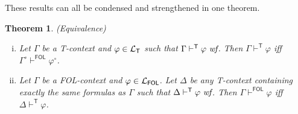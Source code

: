 \documentclass{article}
\newtheorem{theorem}[definition]{Theorem}
\newcommand{\T}{\textsf T}
\newcommand{\FOL}{\textsf{FOL}}
\newcommand{\ofun}[1]{\ensuremath{{#1}^\circ}}
\newcommand{\wf}{\ \mbox{\em wf}}
\newcommand{\lang}[1]{\ensuremath{{\cal L}_{\mathsf{#1}}}}
\newcommand{\myvdash}[1]{\ensuremath{\vdash^{\mathsf{#1}}}}
\begin{document}
\bigskip\noindent
These results can all be condensed and strengthened in one theorem.
\begin{theorem}\label{TequivFOL}
\emph{(Equivalence)}
\begin{enumerate}[(i)]
\item Let $\Gamma$ be a {\T}-context and $\varphi\in\lang{T}$ such that
$\Gamma\myvdash{T}\varphi\wf$.  Then $\Gamma\myvdash{T}\varphi$ iff
$\ofun\Gamma\myvdash{FOL}\ofun\varphi$.
\item Let $\Gamma$ be a {\FOL}-context and $\varphi\in\lang{FOL}$.
Let $\Delta$ be any {\T}-context containing exactly the same formulas
as $\Gamma$ such that $\Delta\myvdash{T}\varphi\wf$.  Then
$\Gamma\myvdash{FOL}\varphi$ iff $\Delta\myvdash{T}\varphi$.
\end{enumerate}
\end{theorem}
\end{document}
